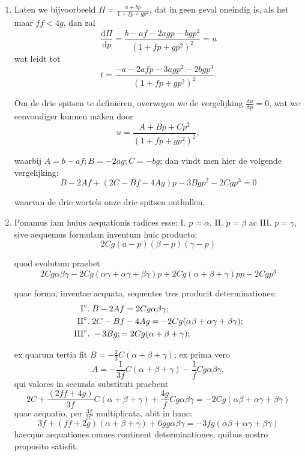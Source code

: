 \documentclass[10pt,a4paper]{article}
\newcommand{\switchenum}{\setcounter{enumi}{\arabic{enumi}-1}\switchcolumn}
\def\D{\mathrm{d}}
\begin{document}
\begin{paracol}{2}
\begin{enumerate}[topsep=1px]
		\switchenum
		\item Laten we bijvoorbeeld $\Pi = \frac{a+bp}{1+fp+gp^2}$, dat in geen geval oneindig is, als het maar $ff< 4g$, dan zal
		\[
			\frac{\D \Pi}{\D p} = \frac{b-af-2agp-bgp^2}{(1+fp+gp^2)^2} = u
		\]
		wat leidt tot
		\[
			t = \frac{-a-2afp-3agp^2-2bgp^3}{(1+fp+gp^2)^2}.
		\]
		\par Om de drie spitsen te definiëren, 	overwegen we de vergelijking $\frac{\D u}{\D p}=0$, wat we eenvoudiger kunnen maken door 
		\[
			u  =  \frac{A+Bp+Cp^2}{(1+fp+gp^2)^2},
		\]
		\par waarbij $A=b-af; B= -2ag; C=-bg$; dan vindt men hier de volgende vergelijking:
		\[
			B-2Af+(2C-Bf-4Ag)p-3Bgp^2-2Cgp^3 = 0
		\]
		\par waarvan de drie wortels onze drie spitsen onthullen.
		
		\switchcolumn*
		
		\item Ponamus iam huius aequationis radices esse: I\degree. $p=\alpha$, II\degree. $p=\beta$ ac III\degree. $p=\gamma$, sive aequemus formulam inventum huic producto:
		\[
			2Cg(a-p)(\beta-p)(\gamma-p)
		\]
		\par quod evolutum praebet
		\[
			2Cg\alpha \beta \gamma - 2Cg(\alpha \gamma+\alpha \gamma+\beta \gamma)p+2Cg(\alpha+\beta+\gamma)pp - 2Cgp^3
		\]
		\par quae forma, inventae aequata, sequentes tres producit determinationes:
		\begin{align*}
			\text{I}\degree. \;& B-2Af = 2Cg\alpha\beta\gamma;\\
			\text{II}\degree. \; & 2C-Bf-4Ag = -2Cg(\alpha \beta +\alpha \gamma+\beta \gamma);\\
			\text{III}\degree. \; & -3Bg; = 2Cg(\alpha+\beta+\gamma);
		\end{align*}
		
		\par ex quarum tertia fit $B=-\frac{2}{3}C(\alpha+\beta+\gamma)$; ex prima vero
		\[
			A = -\frac{1}{3f}C(\alpha+\beta+\gamma)-\frac{1}{f}Cg\alpha \beta \gamma,
		\]
		qui valores in secunda substituti praebent
		\[
			2C+\frac{(2ff+4g)}{3f}C(\alpha+ \beta + \gamma)+\frac{4g}{f}Cg\alpha \beta \gamma  = -2Cg(\alpha \beta + \alpha \gamma+\beta \gamma)
		\]
		quae aequatio, per $\frac{3f}{2C}$ multiplicata, abit in hanc:
		\[
			3f+(ff+2g)(\alpha+\beta+\gamma)+6gg\alpha  \beta \gamma = -3fg(\alpha \beta + \alpha \gamma + \beta \gamma)
		\]
		haecque aequationes omnes continent determinationes, quibus nostro proposito satisfit.
		

\end{enumerate}
\end{paracol}
\end{document}
